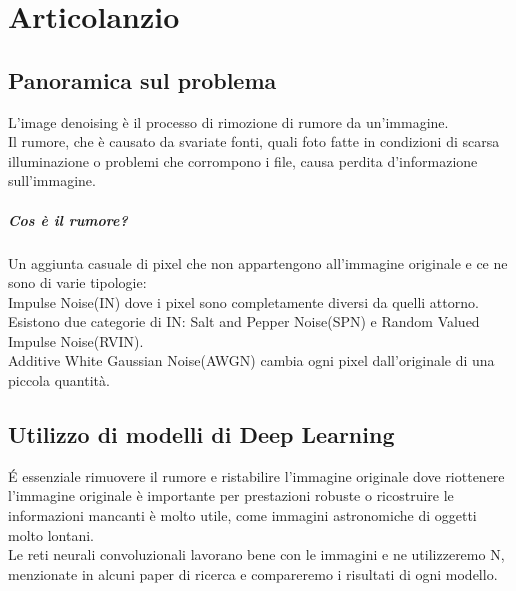 \documentclass[12pt,a4paper,openright,twoside]{book}
\begin{document}
\titleformat{\chapter}{\normalfont\huge \bfseries}{\Huge \thechapter}{20pt}{\Huge}
\tableofcontents

\chapter{Articolanzio}
\section{Panoramica sul problema}
L'image denoising è il processo di rimozione di rumore da un'immagine.\\
Il rumore, che è causato da svariate fonti, quali foto fatte in condizioni di scarsa illuminazione o problemi che corrompono i file, causa perdita d'informazione sull'immagine.
\paragraph{Cos è il rumore?} 
Un aggiunta casuale di pixel che non appartengono all'immagine originale e ce ne sono di varie tipologie:\\
Impulse Noise(IN) dove i pixel sono completamente diversi da quelli attorno. Esistono due categorie di IN: Salt and Pepper Noise(SPN) e Random Valued Impulse Noise(RVIN).\\
Additive White Gaussian Noise(AWGN) cambia ogni pixel dall'originale di una piccola quantità.\\

\section{Utilizzo di modelli di Deep Learning}
\'E essenziale rimuovere il rumore e ristabilire l'immagine originale dove 
riottenere l'immagine originale è importante per prestazioni robuste o ricostruire le informazioni mancanti è molto utile, come immagini astronomiche di oggetti molto lontani.\\
Le reti neurali convoluzionali lavorano bene con le immagini e ne utilizzeremo N, menzionate in alcuni paper di ricerca e compareremo i risultati di ogni modello.\\
\end{document}
